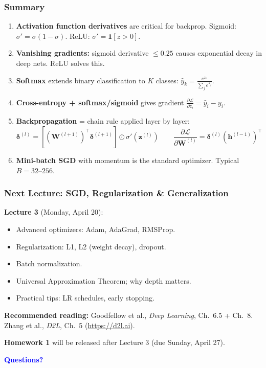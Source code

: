 \documentclass[notes,11pt, aspectratio=169]{beamer}
\newcommand{\vh}{\mathbf{h}}
\newcommand{\vz}{\mathbf{z}}
\newcommand{\vW}{\mathbf{W}}
\newcommand{\pd}[2]{\frac{\partial #1}{\partial #2}}
\begin{document}
\begin{frame}
\frametitle{Summary}

\begin{enumerate}
    \item \textbf{Activation function derivatives} are critical for backprop. Sigmoid: $\sigma' = \sigma(1-\sigma)$. ReLU: $\sigma' = \mathbf{1}[z > 0]$.

    \item \textbf{Vanishing gradients:} sigmoid derivative $\leq 0.25$ causes exponential decay in deep nets. ReLU solves this.

    \item \textbf{Softmax} extends binary classification to $K$ classes: $\hat{y}_k = \frac{e^{z_k}}{\sum_j e^{z_j}}$.

    \item \textbf{Cross-entropy + softmax/sigmoid} gives gradient $\pd{\mathcal{L}}{z_i} = \hat{y}_i - y_i$.

    \item \textbf{Backpropagation} = chain rule applied layer by layer:
    \[
        \bm{\delta}^{(l)} = [(\vW^{(l+1)})^\top \bm{\delta}^{(l+1)}] \odot \sigma'(\vz^{(l)}) \qquad \pd{\mathcal{L}}{\vW^{(l)}} = \bm{\delta}^{(l)}(\vh^{(l-1)})^\top
    \]

    \item \textbf{Mini-batch SGD} with momentum is the standard optimizer. Typical $B = 32$--$256$.
\end{enumerate}
\end{frame}

\begin{frame}
\frametitle{Next Lecture: SGD, Regularization \& Generalization}

\textbf{Lecture 3} (Monday, April 20):
\begin{itemize}
    \item Advanced optimizers: Adam, AdaGrad, RMSProp.
    \item Regularization: L1, L2 (weight decay), dropout.
    \item Batch normalization.
    \item Universal Approximation Theorem; why depth matters.
    \item Practical tips: LR schedules, early stopping.
\end{itemize}

\vspace{6pt}
\textbf{Recommended reading:} Goodfellow et al., \textit{Deep Learning}, Ch.\ 6.5 + Ch.\ 8. Zhang et al., \textit{D2L}, Ch.\ 5 (\url{https://d2l.ai}).

\vspace{6pt}
\textbf{Homework 1} will be released after Lecture 3 (due Sunday, April 27).

\vspace{4pt}
\begin{center}
\Large \textcolor{blue}{\textbf{Questions?}}
\end{center}
\end{frame}
\end{document}
